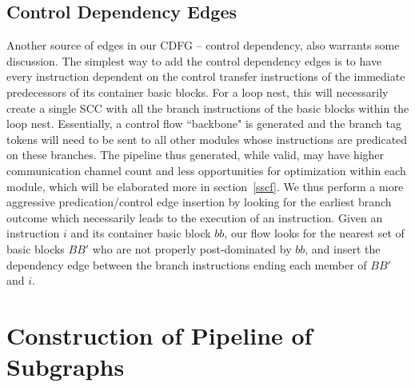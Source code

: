 \subsection{Control Dependency Edges}
Another source of edges in our CDFG -- control dependency, also warrants some 
discussion. The simplest way to add the control dependency edges is to have
every instruction dependent on the control transfer instructions of the immediate
predecessors of its container basic blocks. For a loop nest, this will necessarily
create a single SCC with all the branch instructions of the basic blocks within the loop nest. Essentially, a control flow ``backbone" is generated and the branch
tag tokens will need to be sent to all other modules whose instructions are predicated on these branches. The pipeline thus generated, while valid, may
have higher communication channel count and less opportunities for optimization
within each module, which will be elaborated more in section~\ref{sscf}. We thus
perform a more aggressive predication/control edge insertion by looking for the
earliest branch outcome which necessarily leads to the execution of an instruction. Given an instruction $i$ and its container basic block $bb$, our
flow looks for the nearest set of basic blocks $BB'$ who are not properly post-dominated by $bb$,
and insert the dependency edge between the branch instructions ending each member of $BB'$ and $i$.

\section{Construction of Pipeline of Subgraphs}
\label{sec:consp}


